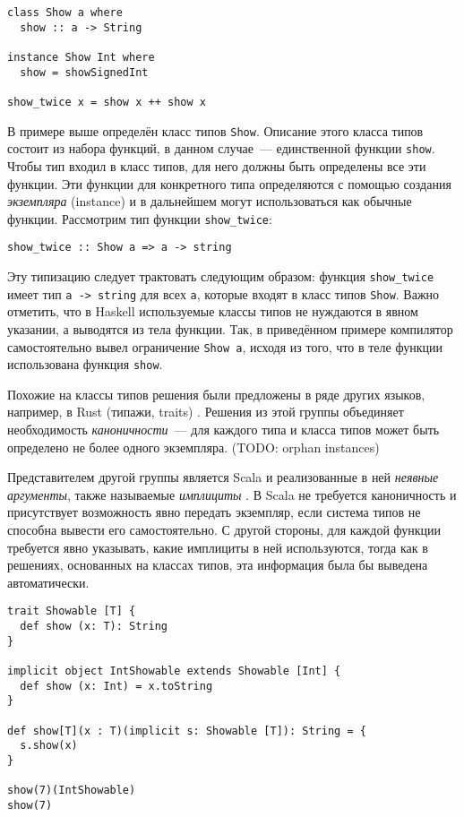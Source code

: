 \documentclass[../diploma.tex]{subfiles}
\begin{document}
\begin{verbatim}
class Show a where
  show :: a -> String

instance Show Int where
  show = showSignedInt

show_twice x = show x ++ show x
\end{verbatim}

В примере выше определён класс типов \texttt{Show}. Описание этого класса типов состоит из набора функций, в данном случае~--- единственной функции \texttt{show}. Чтобы тип входил в класс типов, для него должны быть определены все эти функции. Эти функции для конкретного типа определяются с помощью создания \textit{экземпляра} (instance) и в дальнейшем могут использоваться как обычные функции. Рассмотрим тип функции \texttt{show\_twice}:

\begin{verbatim}
show_twice :: Show a => a -> string
\end{verbatim}

Эту типизацию следует трактовать следующим образом: функция \texttt{show\_twice} имеет тип \texttt{a -> string} для всех \texttt{a}, которые входят в класс типов \texttt{Show}. Важно отметить, что в Haskell используемые классы типов не нуждаются в явном указании, а выводятся из тела функции. Так, в приведённом примере компилятор самостоятельно вывел ограничение \texttt{Show a}, исходя из того, что в теле функции использована функция \texttt{show}.

Похожие на классы типов решения были предложены в ряде других языков, например, в Rust (типажи, traits) \cite{rust}. Решения из этой группы объединяет необходимость \textit{каноничности}~--- для каждого типа и класса типов может быть определено не более одного экземпляра. (TODO: orphan instances)

Представителем другой группы является Scala и реализованные в ней \textit{неявные аргументы}, также называемые \textit{имплициты} \cite{implicits}. В Scala не требуется каноничность и присутствует возможность явно передать экземпляр, если система типов не способна вывести его самостоятельно. С другой стороны, для каждой функции требуется явно указывать, какие имплициты в ней используются, тогда как в решениях, основанных на классах типов, эта информация была бы выведена автоматически.

\begin{verbatim}
trait Showable [T] { 
  def show (x: T): String
}

implicit object IntShowable extends Showable [Int] {
  def show (x: Int) = x.toString
}

def show[T](x : T)(implicit s: Showable [T]): String = {
  s.show(x)
}

show(7)(IntShowable)
show(7)
\end{verbatim}
\end{document}
